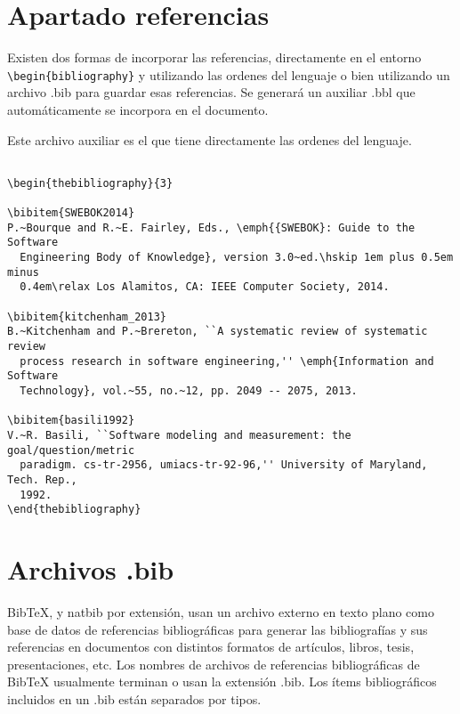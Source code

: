  \section {Apartado referencias}
  Existen dos formas de incorporar las referencias, directamente en el entorno   \lstinline[language=enparrafo]!\begin{bibliography}! y utilizando las ordenes del lenguaje o bien utilizando un archivo .bib para guardar esas referencias. Se generará un auxiliar .bbl que automáticamente se incorpora en el documento.
  
  Este archivo auxiliar es el que tiene directamente las ordenes del lenguaje.
  
 \begin{verbatim}
  
\begin{thebibliography}{3}

\bibitem{SWEBOK2014}
P.~Bourque and R.~E. Fairley, Eds., \emph{{SWEBOK}: Guide to the Software
  Engineering Body of Knowledge}, version 3.0~ed.\hskip 1em plus 0.5em minus
  0.4em\relax Los Alamitos, CA: IEEE Computer Society, 2014.

\bibitem{kitchenham_2013}
B.~Kitchenham and P.~Brereton, ``A systematic review of systematic review
  process research in software engineering,'' \emph{Information and Software
  Technology}, vol.~55, no.~12, pp. 2049 -- 2075, 2013.

\bibitem{basili1992}
V.~R. Basili, ``Software modeling and measurement: the goal/question/metric
  paradigm. cs-tr-2956, umiacs-tr-92-96,'' University of Maryland, Tech. Rep.,
  1992.
\end{thebibliography}

  \end{verbatim}
 
 
 
 \section{Archivos .bib}
 
 BibTeX, y natbib por extensión, usan un archivo externo en texto plano como base de datos de referencias bibliográficas para generar las bibliografías y sus referencias en documentos con distintos formatos de artículos, libros, tesis, presentaciones, etc. Los nombres de archivos de referencias bibliográficas de BibTeX usualmente terminan o usan la extensión .bib. Los ítems bibliográficos incluidos en un .bib están separados por tipos.
 
